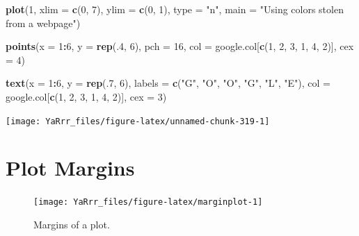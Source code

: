 \documentclass[]{book}
\newenvironment{Shaded}{\begin{snugshade}}{\end{snugshade}}
\newcommand{\KeywordTok}[1]{\textcolor[rgb]{0.13,0.29,0.53}{\textbf{#1}}}
\newcommand{\DataTypeTok}[1]{\textcolor[rgb]{0.13,0.29,0.53}{#1}}
\newcommand{\DecValTok}[1]{\textcolor[rgb]{0.00,0.00,0.81}{#1}}
\newcommand{\StringTok}[1]{\textcolor[rgb]{0.31,0.60,0.02}{#1}}
\newcommand{\OperatorTok}[1]{\textcolor[rgb]{0.81,0.36,0.00}{\textbf{#1}}}
\newcommand{\NormalTok}[1]{#1}
\theoremstyle{definition}
\theoremstyle{definition}
\theoremstyle{remark}
\begin{document}
\begin{Shaded}
\begin{Highlighting}[]
\KeywordTok{plot}\NormalTok{(}\DecValTok{1}\NormalTok{, }
     \DataTypeTok{xlim =} \KeywordTok{c}\NormalTok{(}\DecValTok{0}\NormalTok{, }\DecValTok{7}\NormalTok{), }
     \DataTypeTok{ylim =} \KeywordTok{c}\NormalTok{(}\DecValTok{0}\NormalTok{, }\DecValTok{1}\NormalTok{),}
     \DataTypeTok{type =} \StringTok{"n"}\NormalTok{, }
     \DataTypeTok{main =} \StringTok{"Using colors stolen from a webpage"}\NormalTok{)}

\KeywordTok{points}\NormalTok{(}\DataTypeTok{x =} \DecValTok{1}\OperatorTok{:}\DecValTok{6}\NormalTok{, }
       \DataTypeTok{y =} \KeywordTok{rep}\NormalTok{(.}\DecValTok{4}\NormalTok{, }\DecValTok{6}\NormalTok{),}
       \DataTypeTok{pch =} \DecValTok{16}\NormalTok{,}
       \DataTypeTok{col =}\NormalTok{ google.col[}\KeywordTok{c}\NormalTok{(}\DecValTok{1}\NormalTok{, }\DecValTok{2}\NormalTok{, }\DecValTok{3}\NormalTok{, }\DecValTok{1}\NormalTok{, }\DecValTok{4}\NormalTok{, }\DecValTok{2}\NormalTok{)],}
       \DataTypeTok{cex =} \DecValTok{4}\NormalTok{)}

\KeywordTok{text}\NormalTok{(}\DataTypeTok{x =} \DecValTok{1}\OperatorTok{:}\DecValTok{6}\NormalTok{, }
     \DataTypeTok{y =} \KeywordTok{rep}\NormalTok{(.}\DecValTok{7}\NormalTok{, }\DecValTok{6}\NormalTok{),}
     \DataTypeTok{labels =} \KeywordTok{c}\NormalTok{(}\StringTok{"G"}\NormalTok{, }\StringTok{"O"}\NormalTok{, }\StringTok{"O"}\NormalTok{, }\StringTok{"G"}\NormalTok{, }\StringTok{"L"}\NormalTok{, }\StringTok{"E"}\NormalTok{), }
     \DataTypeTok{col =}\NormalTok{ google.col[}\KeywordTok{c}\NormalTok{(}\DecValTok{1}\NormalTok{, }\DecValTok{2}\NormalTok{, }\DecValTok{3}\NormalTok{, }\DecValTok{1}\NormalTok{, }\DecValTok{4}\NormalTok{, }\DecValTok{2}\NormalTok{)],}
     \DataTypeTok{cex =} \DecValTok{3}\NormalTok{)}
\end{Highlighting}
\end{Shaded}

\begin{center}\texttt{[image: YaRrr\_files/figure-latex/unnamed-chunk-319-1]} \end{center}

\section{Plot Margins}\label{plot-margins}

\begin{figure}

{\centering \texttt{[image: YaRrr\_files/figure-latex/marginplot-1]} 

}

\caption{Margins of a plot.}\label{fig:marginplot}
\end{figure}
\end{document}
